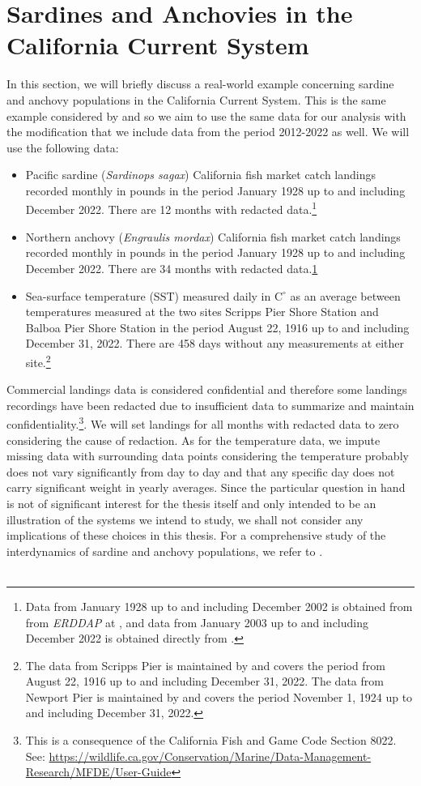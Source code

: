 \documentclass[11pt, a4paper]{memoir}
\theoremstyle{plain}
\theoremstyle{definition}
\begin{document}
\section{Sardines and Anchovies in the California Current System}
In this section, we will briefly discuss a real-world example concerning sardine and anchovy populations in the California Current System. This is the same example considered by \cite{Sugihara} and so we aim to use the same data for our analysis with the modification that we include data from the period 2012-2022 as well. We will use the following data:
\begin{itemize}
\item Pacific sardine (\textit{Sardinops sagax}) California fish market catch landings recorded monthly in pounds in the period January 1928 up to and including December 2022. There are 12 months with redacted data.\footnote{\label{note1}Data from January 1928 up to and including December 2002 is obtained from from \textit{ERDDAP} at \cite{oldData}, and data from January 2003 up to and including December 2022 is obtained directly from \cite{newData}.}
\item Northern anchovy (\textit{Engraulis mordax}) California fish market catch landings recorded monthly in pounds in the period January 1928 up to and including December 2022. There are 34 months with redacted data.\cref{note1} 
\item  Sea-surface temperature (SST) measured daily in $\text{C}^\circ$ as an average between temperatures measured at the two sites Scripps Pier Shore Station and Balboa Pier Shore Station in the period August 22, 1916 up to and including December 31, 2022. There are 458 days without any measurements at either site.\footnote{The data from Scripps Pier is maintained by \cite{Scripps} and covers the period from August 22, 1916 up to and including December 31, 2022. The data from Newport Pier is maintained by \cite{Newport} and covers the period November 1, 1924 up to and including December 31, 2022.} 
\end{itemize}
Commercial landings data is considered confidential and therefore some landings recordings have been redacted due to insufficient data to summarize and maintain confidentiality.\footnote{This is a consequence of the California Fish and Game Code Section 8022. See: \url{https://wildlife.ca.gov/Conservation/Marine/Data-Management-Research/MFDE/User-Guide}}. We will set landings for all months with redacted data to zero considering the cause of redaction. As for the temperature data, we impute missing data with surrounding data points considering the temperature probably does not vary significantly from day to day and that any specific day does not carry significant weight in yearly averages. Since the particular question in hand is not of significant interest for the thesis itself and only intended to be an illustration of the systems we intend to study, we shall not consider any implications of these choices in this thesis. For a comprehensive study of the interdynamics of sardine and anchovy populations, we refer to \cite{Sardine}.\\\\
\end{document}
